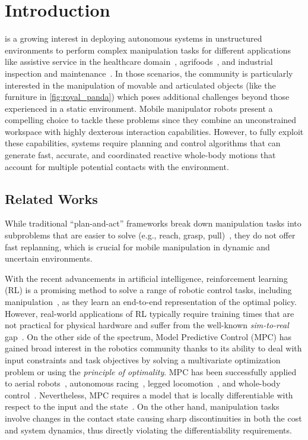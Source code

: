 \section{Introduction} \label{sec:introduction}
\showthe\font
{} is a growing interest in deploying autonomous systems in unstructured environments to perform complex manipulation tasks for different applications like assistive service in the healthcare domain~\cite{cooper2020ari}, agrifoods~\cite{duckett2018agricultural}, and industrial inspection and maintenance~\cite{lattanzi2017review}. In those scenarios, the community is particularly interested in the manipulation of movable and articulated objects (like the furniture in \fig\ref{fig:royal_panda}) which poses additional challenges beyond those experienced in a static environment. Mobile manipulator robots present a compelling choice to tackle these problems since they combine an unconstrained workspace with highly dexterous interaction capabilities. However, to fully exploit these capabilities, systems require planning and control algorithms that can generate fast, accurate, and coordinated reactive whole-body motions that account for multiple potential contacts with the environment. 

\subsection{Related Works}

While traditional ``plan-and-act'' frameworks break down manipulation tasks into subproblems that are easier to solve (e.g., reach, grasp, pull)~\cite{Murali2020}, they do not offer fast replanning, which is crucial for mobile manipulation in dynamic and uncertain environments.

With the recent advancements in artificial intelligence, reinforcement learning (RL) is a promising method to solve a range of robotic control tasks, including manipulation~\cite{finn2016deep}, as they learn an end-to-end representation of the optimal policy. However, real-world applications of RL typically require training times that are not practical for physical hardware and suffer from the well-known \textit{sim-to-real} gap~\cite{chebotar2019closing}. 
On the other side of the spectrum, Model Predictive Control (MPC) has gained broad interest in the robotics community thanks to its ability to deal with input constraints and task objectives by solving a multivariate optimization problem or using the \textit{principle of optimality}. 
MPC has been successfully applied to aerial robots~\cite{peric2021direct}, autonomous racing~\cite{liniger2015optimization}, legged locomotion~\cite{grandia2019frequency}, and whole-body control~\cite{minniti2019whole}. 
Nevertheless, MPC requires a model that is locally differentiable with respect to the input and the state~\cite{buchli2017optimal}. On the other hand, manipulation tasks involve changes in the contact state causing sharp discontinuities in both the cost and system dynamics, thus directly violating the differentiability requirements. 


